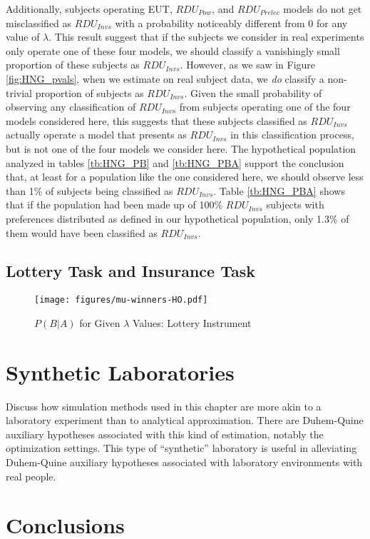 \documentclass[11pt,a4paper]{report}
\newcommand{\onlyinsubfile}[1]{#1}
\newcommand{\notinsubfile}[1]{}
\begin{document}
Additionally, subjects operating EUT, $\mathit{RDU_{Pow}}$, and $\mathit{RDU_{Prelec}}$ models do not get misclassified as $\mathit{RDU_{Invs}}$ with a probability noticeably different from 0 for any value of $\lambda$.
This result suggest that if the subjects we consider in real experiments only operate one of these four models, we should classify a vanishingly small proportion of these subjects as $\mathit{RDU_{Invs}}$.
However, as we saw in Figure \ref{fig:HNG_pvals}, when we estimate on real subject data, we \textit{do} classify a non-trivial proportion of subjects as $\mathit{RDU_{Invs}}$.
Given the small probability of observing any classification of $\mathit{RDU_{Invs}}$ from subjects operating one of the four models considered here, this suggests that these subjects classified as $\mathit{RDU_{Invs}}$ actually operate a model that presents as $\mathit{RDU_{Invs}}$ in this classification process, but is not one of the four models we consider here.
The hypothetical population analyzed in tables \ref{tb:HNG_PB} and \ref{tb:HNG_PBA} support the conclusion that, at least for a population like the one considered here, we should observe less than 1\% of subjects being classified as $\mathit{RDU_{Invs}}$.
Table \ref{tb:HNG_PBA} shows that if the population had been made up of 100\% $\mathit{RDU_{Invs}}$ subjects with preferences distributed as defined in our hypothetical population, only 1.3\% of them would have been classified as $\mathit{RDU_{Invs}}$.


\subsection{ \texorpdfstring{\textcite{Hey1994}}{Hey and Orme (1994)} Lottery Task and \texorpdfstring{\textcite{Harrison2016}}{Harrison and Ng (2016)} Insurance Task}
\begin{figure}[h!]
	\center
	\caption{$P(B|A)$ for Given $\lambda$ Values: \textcite{Hey1994} Lottery Instrument}
	\onlyinsubfile{
		\texttt{[image: figures/mu-winners-HO.pdf]}
	}
	\notinsubfile{
		\texttt{[image: ch4/figures/mu-winners-HO.pdf]}
	}
	\label{fig:HO_mu_winner}
\end{figure}
\section{Synthetic Laboratories}

Discuss how simulation methods used in this chapter are more akin to a laboratory experiment than to analytical approximation.
There are Duhem-Quine auxiliary hypotheses associated with this kind of estimation, notably the optimization settings.
This type of \enquote{synthetic} laboratory is useful in alleviating Duhem-Quine auxiliary hypotheses associated with laboratory environments with real people.

\section{Conclusions}

\onlyinsubfile{
\newpage
\printbibliography[segment=4, heading=subbibliography]
}



\printbibliography
\end{document}
